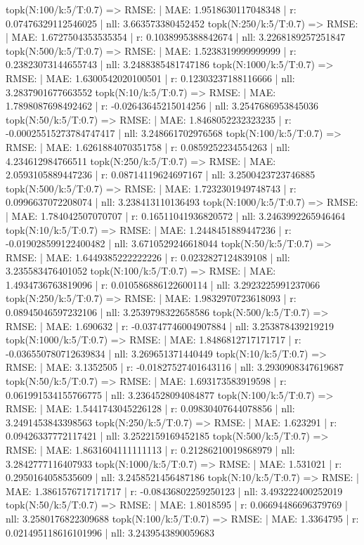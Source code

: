 topk(N:100/k:5/T:0.7) => RMSE: | MAE: 1.9518630117048348 | r: 0.07476329112546025 | nll: 3.663573380452452
topk(N:250/k:5/T:0.7) => RMSE: | MAE: 1.6727504353535354 | r: 0.1038995388842674 | nll: 3.2268189257251847
topk(N:500/k:5/T:0.7) => RMSE: | MAE: 1.5238319999999999 | r: 0.23823073144655743 | nll: 3.2488385481747186
topk(N:1000/k:5/T:0.7) => RMSE: | MAE: 1.6300542020100501 | r: 0.12303237188116666 | nll: 3.2837901677663552
topk(N:10/k:5/T:0.7) => RMSE: | MAE: 1.7898087698492462 | r: -0.02643645215014256 | nll: 3.2547686953845036
topk(N:50/k:5/T:0.7) => RMSE: | MAE: 1.8468052232323235 | r: -0.00025515273784747417 | nll: 3.248661702976568
topk(N:100/k:5/T:0.7) => RMSE: | MAE: 1.6261884070351758 | r: 0.0859252234554263 | nll: 4.234612984766511
topk(N:250/k:5/T:0.7) => RMSE: | MAE: 2.0593105889447236 | r: 0.08714119624697167 | nll: 3.2500423723746885
topk(N:500/k:5/T:0.7) => RMSE: | MAE: 1.7232301949748743 | r: 0.0996637072208074 | nll: 3.238413110136493
topk(N:1000/k:5/T:0.7) => RMSE: | MAE: 1.784042507070707 | r: 0.16511041936820572 | nll: 3.2463992265946464
topk(N:10/k:5/T:0.7) => RMSE: | MAE: 1.2448451889447236 | r: -0.019028599122400482 | nll: 3.6710529246618044
topk(N:50/k:5/T:0.7) => RMSE: | MAE: 1.6449385222222226 | r: 0.0232827124839108 | nll: 3.235583476401052
topk(N:100/k:5/T:0.7) => RMSE: | MAE: 1.4934736763819096 | r: 0.010586886122600114 | nll: 3.2923225991237066
topk(N:250/k:5/T:0.7) => RMSE: | MAE: 1.9832970723618093 | r: 0.08945046597232106 | nll: 3.2539798322658586
topk(N:500/k:5/T:0.7) => RMSE: | MAE: 1.690632 | r: -0.03747746004907884 | nll: 3.253878439219219
topk(N:1000/k:5/T:0.7) => RMSE: | MAE: 1.8486812717171717 | r: -0.036550780712639834 | nll: 3.269651371440449
topk(N:10/k:5/T:0.7) => RMSE: | MAE: 3.1352505 | r: -0.01827527401643116 | nll: 3.2930908347619687
topk(N:50/k:5/T:0.7) => RMSE: | MAE: 1.693173583919598 | r: 0.061991534155766775 | nll: 3.2364528094084877
topk(N:100/k:5/T:0.7) => RMSE: | MAE: 1.5441743045226128 | r: 0.09830407644078856 | nll: 3.2491453843398563
topk(N:250/k:5/T:0.7) => RMSE: | MAE: 1.623291 | r: 0.09426337772117421 | nll: 3.2522159169452185
topk(N:500/k:5/T:0.7) => RMSE: | MAE: 1.8631604111111113 | r: 0.21286210019868979 | nll: 3.2842777116407933
topk(N:1000/k:5/T:0.7) => RMSE: | MAE: 1.531021 | r: 0.2950164058535609 | nll: 3.2458521456487186
topk(N:10/k:5/T:0.7) => RMSE: | MAE: 1.3861576717171717 | r: -0.08436802259250123 | nll: 3.493222400252019
topk(N:50/k:5/T:0.7) => RMSE: | MAE: 1.8018595 | r: 0.06694486696379769 | nll: 3.2580176822309688
topk(N:100/k:5/T:0.7) => RMSE: | MAE: 1.3364795 | r: 0.021495118616101996 | nll: 3.2439543890059683
